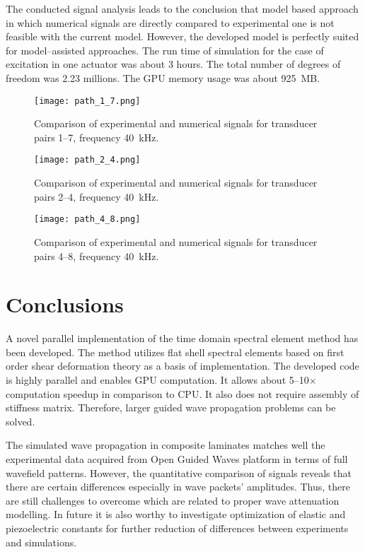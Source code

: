 \documentclass[preprint,12pt]{elsarticle}
\begin{document}
The conducted signal analysis leads to the conclusion that model based approach in which numerical signals are directly compared to experimental one is not feasible with the current model. However, the developed model is perfectly suited for model--assisted approaches. The run time of simulation for the case of excitation in one actuator was about 3 hours. The total number of degrees of freedom was 2.23 millions. The GPU memory usage was about 925~MB.

	\begin{figure} [h!]
			\centering
			\texttt{[image: path\_1\_7.png]}	
			\caption{Comparison of experimental and numerical signals for transducer pairs 1--7, frequency 40~kHz.}
			\label{fig:path1_7}
	\end{figure}
	\begin{figure} [h!]
		\centering
		\texttt{[image: path\_2\_4.png]}	
		\caption{Comparison of experimental and numerical signals for transducer pairs 2--4, frequency 40~kHz.}
		\label{fig:path2_4}
	\end{figure}
	\begin{figure} [h!]
		\centering
		\texttt{[image: path\_4\_8.png]}	
		\caption{Comparison of experimental and numerical signals for transducer pairs 4--8, frequency 40~kHz.}
		\label{fig:path4_8}
	\end{figure}
\clearpage
	\section{Conclusions}
	A novel parallel implementation of the time domain spectral element method has been developed. The method utilizes flat shell spectral elements based on first order shear deformation theory as a basis of implementation. The developed code is highly parallel and enables GPU computation. It allows about 5--10$\times$ computation speedup in comparison to CPU. It also does not require assembly of stiffness matrix. Therefore, larger guided wave propagation problems can be solved.
	
	The simulated wave propagation in composite laminates matches well the experimental data acquired from Open Guided Waves platform in terms of full wavefield patterns. However, the quantitative comparison of signals reveals that there are certain differences especially in wave packets' amplitudes. Thus, there are still challenges to overcome which are related to proper wave attenuation modelling. In future it is also worthy to investigate optimization of elastic and piezoelectric constants for further reduction of differences between experiments and simulations.
	
\end{document}
